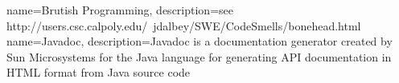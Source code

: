 {
  name={Brutish Programming},
  description={see http://users.csc.calpoly.edu/~jdalbey/SWE/CodeSmells/bonehead.html}
}
{
  name={Javadoc},
  description={Javadoc is a documentation generator created by Sun Microsystems for the Java language for generating API documentation in HTML format from Java source code}
}



